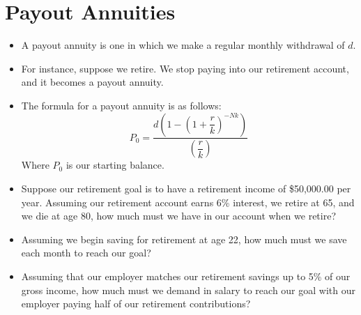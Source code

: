 \documentclass{article}
\begin{document}
\section{Payout Annuities}
\begin{itemize}
    \item A payout annuity is one in which we make a regular monthly
        withdrawal of $d$.
    \item For instance, suppose we retire.  We stop paying into our
        retirement account, and it becomes a payout annuity.
    \item The formula for a payout annuity is as follows:
    \[
            P_0 = \dfrac{d\left(1-\left(1+\dfrac{r}{k}\right)^{-Nk} \right)}%
                        {\left(\dfrac{r}{k}\right)}
    \]
    Where $P_0$ is our starting balance.

    \item Suppose our retirement goal is to have a retirement income
        of \$50,000.00 per year.  Assuming our retirement account
        earns 6\% interest, we retire at 65, and we die at age 80, how
        much must we have in our account when we retire?

    \item Assuming we begin saving for retirement at age 22, how much
        must we save each month to reach our goal?

    \item Assuming that our employer matches our retirement savings up
        to 5\% of our gross income, how much must we demand in salary to
        reach our goal with our employer paying half of our retirement
        contributions?
\end{itemize}
\end{document}
